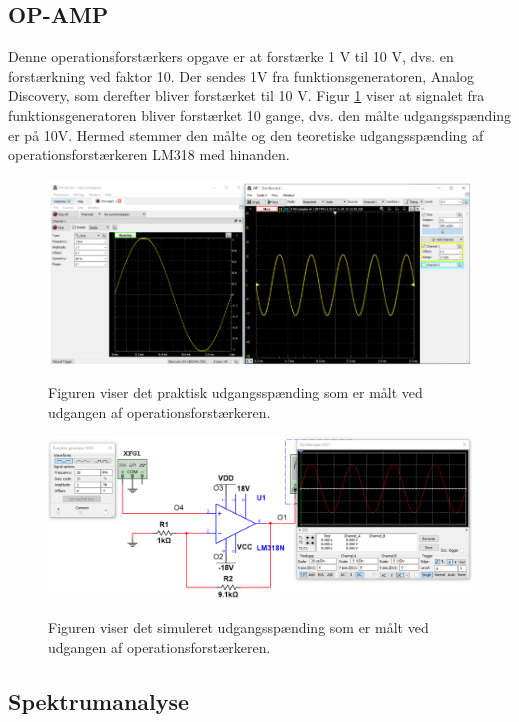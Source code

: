 \subsection{OP-AMP}

Denne operationsforstærkers opgave er at forstærke 1 V til 10 V, dvs. en forstærkning ved faktor 10. Der sendes 1V fra funktionsgeneratoren, Analog Discovery, som derefter bliver forstærket til 10 V. Figur \ref{TestAfOpAmp} viser at signalet fra funktionsgeneratoren bliver forstærket 10 gange, dvs. den målte udgangsspænding er på 10V. Hermed stemmer den målte og den teoretiske udgangsspænding af operationsforstærkeren LM318 med hinanden.  

\begin{figure}[H] 
\centering
{\includegraphics[width=14cm]
{Figure/TestOpamp.PNG}}
\caption{Figuren viser det praktisk udgangsspænding som er målt ved udgangen af operationsforstærkeren.}
\label{TestAfOpAmp}
\end{figure}


\begin{figure}[H] 
\centering
{\includegraphics[width=\linewidth]
{Figure/opampmultisim}}
\caption{Figuren viser det simuleret udgangsspænding som er målt ved udgangen af operationsforstærkeren.}
\label{opampmultisim}
\end{figure}


\subsection{Spektrumanalyse}


